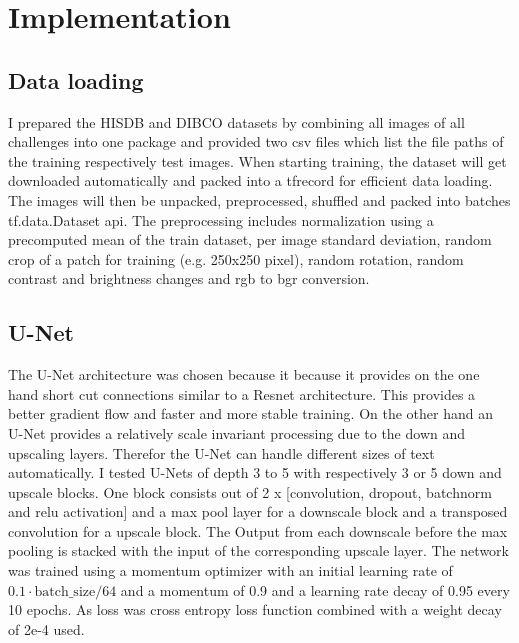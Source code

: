 \documentclass[a4paper, 9pt, twocolumn]{extarticle}
\begin{document}

\section{Implementation}
\label{section:implementation}

\subsection*{Data loading}

I prepared the HISDB and DIBCO datasets by combining all images of all
challenges into one package and provided two csv files which list the file paths
of the training respectively test images. When starting training, the dataset
will get downloaded automatically and packed into a tfrecord for efficient data
loading. The images will then be unpacked, preprocessed, shuffled and packed
into batches tf.data.Dataset api. The preprocessing includes normalization using
a precomputed mean of the train dataset, per image standard deviation, random
crop of a patch for training (e.g. 250x250 pixel), random rotation, random
contrast and brightness changes and rgb to bgr conversion.

\subsection*{U-Net}

The U-Net architecture was chosen because it because it provides on the one hand
short cut connections similar to a Resnet architecture. This provides a better
gradient flow and faster and more stable training. On the other hand an U-Net
provides a relatively scale invariant processing due to the down and upscaling
layers. Therefor the U-Net can handle different sizes of text automatically. I
tested U-Nets of depth 3 to 5 with respectively 3 or 5 down and upscale blocks.
One block consists out of 2 x [convolution, dropout, batchnorm and relu
activation] and a max pool layer for a downscale block and a transposed
convolution for a upscale block. The Output from each downscale before the max
pooling is stacked with the input of the corresponding upscale layer. The
network was trained using a momentum optimizer with an initial learning rate of
$0.1\cdot \text{batch\_size} / 64$ and a momentum of 0.9 and a learning rate
decay of 0.95 every 10 epochs. As loss was cross entropy loss function combined
with a weight decay of 2e-4 used.
\end{document}
